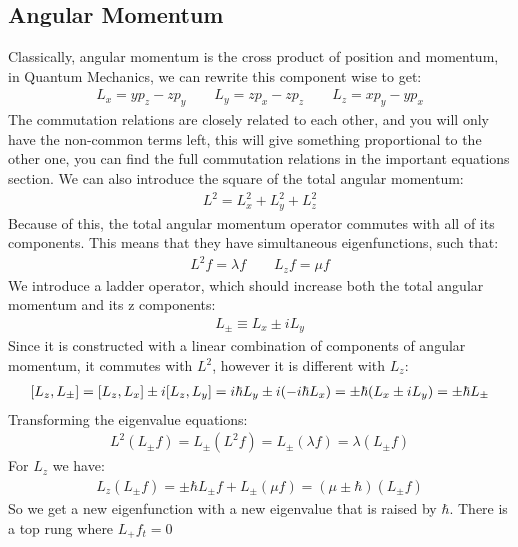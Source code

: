 \subsection{Angular Momentum}
Classically, angular momentum is the cross product of position and momentum, in Quantum Mechanics, we can rewrite this component wise to get:
\begin{align*}
  L_x=yp_z-zp_y\qquad L_y=zp_x-zp_z\qquad L_z=xp_y-yp_x
\end{align*}
The commutation relations are closely related to each other, and you will only have the non-common terms left, this will give something proportional to the other one, you can find the full commutation relations in the important equations section. We can also introduce the square of the total angular momentum:
\begin{align*}
  L^2=L_x^2+L_y^2+L_z^2
\end{align*}
Because of this, the total angular momentum operator commutes with all of its components. This means that they have simultaneous eigenfunctions, such that:
\begin{align*}
  L^2f=\lambda f\qquad L_zf=\mu f
\end{align*}
We introduce a ladder operator, which should increase both the total angular momentum and its z components:
\begin{align*}
  L_\pm\equiv L_x\pm iL_y
\end{align*}
Since it is constructed with a linear combination of components of angular momentum, it commutes with $L^2$, however it is different with $L_z$:
\begin{align*}
  \comm{L_z}{L_\pm}=\comm{L_z}{L_x}\pm i\comm{L_z}{L_y}=i\hbar L_y\pm i(-i\hbar L_x)=
  \pm\hbar(L_x\pm iL_y)=\pm\hbar L_\pm
\end{align*}
Transforming the eigenvalue equations:
\begin{align*}
  L^2(L_\pm f)=L_\pm(L^2f)=L_\pm(\lambda f)=\lambda(L_\pm f)
\end{align*}
For $L_z$ we have:
\begin{align*}
  L_z(L_\pm f)=\pm\hbar L_\pm f+L_\pm(\mu f)=(\mu\pm\hbar)(L_\pm f)
\end{align*}
So we get a new eigenfunction with a new eigenvalue that is raised by $\hbar$. There is a top rung where $L_+f_t=0$